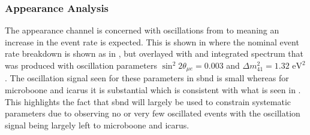 \subsubsection{\texorpdfstring{\nue Appearance Analysis}{nue Appearance Analysis}}\label{sec:nue_app}

The \nue appearance channel is concerned with oscillations from \numu to \nue meaning an increase in the event rate is expected. This is shown in  where the nominal event rate breakdown is shown as in , but overlayed with and integrated spectrum that was produced with oscillation parameters \mbox{$\sin^2{2\theta_{\mu e}} = 0.003$} and $\Delta m^2_{41} = 1.32 \text{ eV}^2$. The oscillation signal seen for these parameters in \gls{sbnd} is small whereas for \gls{microboone} and \gls{icarus} it is substantial which is consistent with what is seen in . This highlights the fact that \gls{sbnd} will largely be used to constrain systematic parameters due to observing no or very few oscillated events with the oscillation signal being largely left to \gls{microboone} and \gls{icarus}. 



